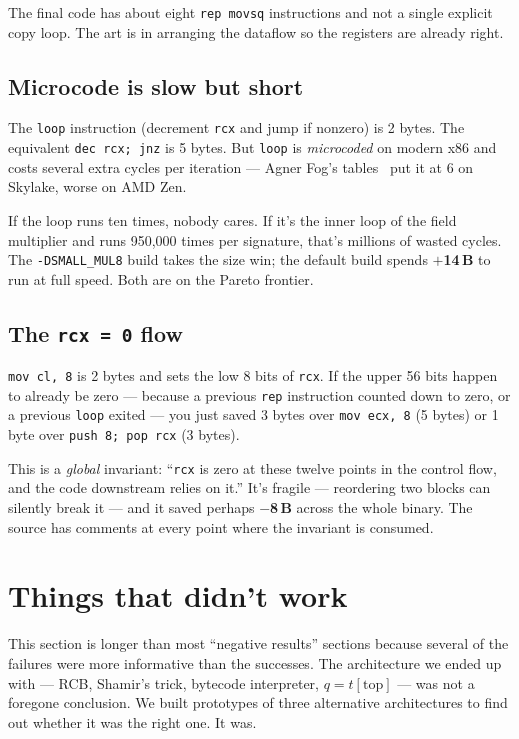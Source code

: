 \documentclass[11pt,a4paper]{article}
\newcommand{\saved}[1]{\textcolor{green!50!black}{\textbf{$-$#1\,B}}}
\newcommand{\spent}[1]{\textcolor{red!70!black}{\textbf{$+$#1\,B}}}
\begin{document}
The final code has about eight \texttt{rep movsq} instructions and
not a single explicit copy loop. The art is in arranging the dataflow
so the registers are already right.

\subsection{Microcode is slow but short}

The \texttt{loop} instruction (decrement \texttt{rcx} and jump if
nonzero) is 2 bytes. The equivalent \texttt{dec rcx; jnz} is 5 bytes.
But \texttt{loop} is \emph{microcoded} on modern x86 and costs
several extra cycles per iteration --- Agner Fog's
tables~\cite{agner} put it at 6 on Skylake, worse on AMD Zen.

If the loop runs ten times, nobody cares. If it's the inner loop of
the field multiplier and runs 950{,}000 times per signature, that's
millions of wasted cycles. The \texttt{-DSMALL\_MUL8} build takes the
size win; the default build spends \spent{14} to run at full speed.
Both are on the Pareto frontier.

\subsection{The \texttt{rcx = 0} flow}

\texttt{mov cl, 8} is 2 bytes and sets the low 8 bits of \texttt{rcx}.
If the upper 56 bits happen to already be zero --- because a previous
\texttt{rep} instruction counted down to zero, or a previous
\texttt{loop} exited --- you just saved 3 bytes over
\texttt{mov ecx, 8} (5 bytes) or 1 byte over \texttt{push 8; pop rcx}
(3 bytes).

This is a \emph{global} invariant: ``\texttt{rcx} is zero at these
twelve points in the control flow, and the code downstream relies on
it.'' It's fragile --- reordering two blocks can silently break it
--- and it saved perhaps \saved{8} across the whole binary. The
source has comments at every point where the invariant is consumed.

\section{Things that didn't work}
\label{sec:deadends}

This section is longer than most ``negative results'' sections because
several of the failures were more informative than the successes. The
architecture we ended up with --- RCB, Shamir's trick, bytecode
interpreter, $q=t[\text{top}]$ --- was not a foregone conclusion. We
built prototypes of three alternative architectures to find out whether
it was the right one. It was.
\end{document}
